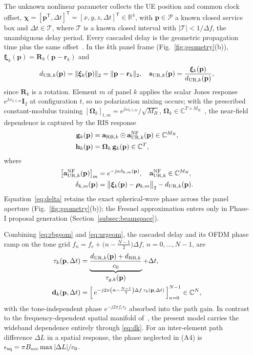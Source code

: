 \documentclass[letterpaper,journal]{IEEEtran}
\newcommand{\R}{\mathbb{R}}
\newcommand{\C}{\mathbb{C}}
\newcommand{\bp}{\mathbf{p}}
\newcommand{\ba}{\mathbf{a}}
\newcommand{\bd}{\mathbf{d}}
\newcommand{\bh}{\mathbf{h}}
\newcommand{\bg}{\mathbf{g}}
\newcommand{\br}{\mathbf{r}}
\newcommand{\bs}{\mathbf{s}}
\newcommand{\bI}{\mathbf{I}}
\newcommand{\bR}{\mathbf{R}}
\newcommand{\bOmega}{\boldsymbol{\Omega}}
\newcommand{\brho}{\boldsymbol{\rho}}
\newcommand{\bchi}{\boldsymbol{\chi}}
\newcommand{\bxi}{\boldsymbol{\xi}}
\begin{document}
The unknown nonlinear parameter collects the UE position and common clock
offset, $\bchi=[\bp^{\mathsf T},\Delta t]^{\mathsf T}
=[x,y,z,\Delta t]^{\mathsf T}\in\R^4$, with $\bp\in\mathcal P$ a known closed
service box and $\Delta t\in\mathcal T$, where $\mathcal T$ is a known closed
interval with $|\mathcal T|<1/\Delta f$, the unambiguous delay period. Every cascaded delay is
the geometric propagation time plus the same offset~\cite{fascista2022rissync,gong2024async,yan2025ris}.
In the $k$th panel frame (Fig.~\ref{fig:geometry}(b)),
$\bxi_k(\bp)=\bR_k(\bp-\br_k)$ and
\begin{equation}
	d_{{\rm UR},k}(\bp)=\|\bxi_k(\bp)\|_2=\|\bp-\br_k\|_2,
	\quad
	\bs_{{\rm UR},k}(\bp)=\frac{\bxi_k(\bp)}{d_{{\rm UR},k}(\bp)},
	\label{eq:urgeom}
\end{equation}
since $\bR_k$ is a rotation. Element $m$ of panel $k$
applies the scalar Jones response $e^{j\omega_{k,t,m}}\bI_2$ at configuration
$t$, so no polarization mixing occurs; with the prescribed constant-modulus
training $[\bOmega_k]_{t,m}=e^{j\omega_{k,t,m}}/\sqrt{M_R}$,
$\bOmega_k\in\C^{T\times M_R}$~\cite{lin2021tensor}, the near-field
dependence is captured by the RIS response
\begin{align}
	\bg_k(\bp) &= \ba_{{\rm RB},k}\odot\ba^{\rm NF}_{{\rm UR},k}(\bp)
	\in\C^{M_R},\nonumber\\
	\bh_k(\bp) &= \bOmega_k\,\bg_k(\bp)\in\C^{T},
	\label{eq:hk}
\end{align}
where
\begin{align}
	\big[\ba^{\rm NF}_{{\rm UR},k}(\bp)\big]_m
	&= e^{-j\kappa\delta_{k,m}(\bp)},
	\quad \ba^{\rm NF}_{{\rm UR},k}\in\C^{M_R},\nonumber\\
	\delta_{k,m}(\bp)
	&= \big\|\bxi_k(\bp)-\brho_{k,m}\big\|_2
	- d_{{\rm UR},k}(\bp).
	\label{eq:delta}
\end{align}
Equation~\eqref{eq:delta} retains the exact spherical-wave phase across the
panel aperture (Fig.~\ref{fig:geometry}(b)); the Fresnel approximation enters
only in Phase-I proposal generation (Section~\ref{subsec:beamspace}).

Combining \eqref{eq:rbgeom} and \eqref{eq:urgeom}, the cascaded delay and its
OFDM phase ramp on the tone grid
$f_n=f_c+\big(n-\tfrac{N-1}{2}\big)\Delta f$, $n=0,\ldots,N-1$, are
\begin{align}
	\tau_k(\bp,\Delta t)
	&= \underbrace{\frac{d_{{\rm UR},k}(\bp) + d_{{\rm RB},k}}{c_0}}_{
	\textstyle \tau_{g,k}(\bp)} + \Delta t,\nonumber\\
	\bd_k(\bp,\Delta t)
	&= \Big[\,e^{-j2\pi\left(n-\frac{N-1}{2}\right)\Delta f\,
	\tau_k(\bp,\Delta t)}\,\Big]_{n=0}^{N-1}\in\C^N,
	\label{eq:dk}
\end{align}
with the tone-independent phase $e^{-j2\pi f_c\tau_k}$ absorbed into the
path gain. In contrast to the
frequency-dependent spatial manifold of~\cite{yang2024nfris}, the present
model carries the wideband dependence entirely through \eqref{eq:dk}. For an
inter-element path difference $\Delta L$ in a spatial response, the phase
neglected in (A4) is $\epsilon_{\rm sq}=\pi B_{\rm occ}\max|\Delta L|/c_0$.
\end{document}
